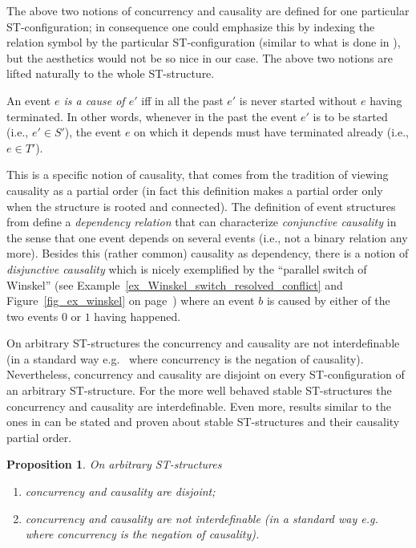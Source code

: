 \documentclass[submission,copyright,creativecommons]{eptcs}
\newtheorem{proposition}[theorem]{Proposition}
\newcounter{case}
\begin{document}
The above two notions of concurrency and causality are defined for one particular ST-configura\-tion; in consequence one could emphasize this by indexing the relation symbol by the particular ST-configuration (similar to what is done in \cite[Sec.5.3]{GlabbeekG01refinement}), but the aesthetics would not be so nice in our case.
The above two notions are lifted naturally to the whole ST-structure.

An event \textit{$e$ is a cause of $e'$} 
iff in all the past $e'$ is never started without $e$ having terminated. In other words, whenever in the past the event $e'$ is to be started (i.e., $e'\in S'$), the event $e$ on which it depends must have terminated already (i.e., $e\in T'$).

This is a specific notion of causality, that comes from the tradition of viewing causality as a partial order (in fact this definition makes a partial order only when the structure is rooted and connected). The definition of event structures from \cite{GlabbeekP09configStruct} define a \textit{dependency relation} that can characterize \textit{conjunctive causality} in the sense that one event depends on several events (i.e., not a binary relation any more). Besides this (rather common) causality as dependency, there is a notion of \textit{disjunctive causality} which is nicely exemplified by the ``parallel switch of Winskel'' (see Example~\ref{ex_Winskel_switch_resolved_conflict} and Figure~\ref{fig_ex_winskel} on page~\pageref{fig_ex_winskel}) where an event $b$ is caused by either of the two events $0$ or $1$ having happened.

On arbitrary ST-structures the concurrency and causality are not interdefinable (in a standard way e.g.\ \cite[Def.5.6]{GlabbeekG01refinement} where concurrency is the negation of causality). Nevertheless, concurrency and causality are disjoint on every ST-configuration of an arbitrary ST-structure.
For the more well behaved stable ST-structures the concurrency and causality are interdefinable. Even more, results similar to the ones in \cite[Sec.5.3]{GlabbeekG01refinement} can be stated and proven about stable ST-structures and their causality partial order.




\begin{proposition}\label{prop_concDisjCausal}
On arbitrary ST-structures 
\begin{enumerate}
\item concurrency and causality are \emph{disjoint};
\item concurrency and causality are \emph{not interdefinable} (in a standard way e.g.\ \cite[Def.5.6]{GlabbeekG01refinement} where concurrency is the negation of causality).
\end{enumerate}
\end{proposition}
\end{document}
